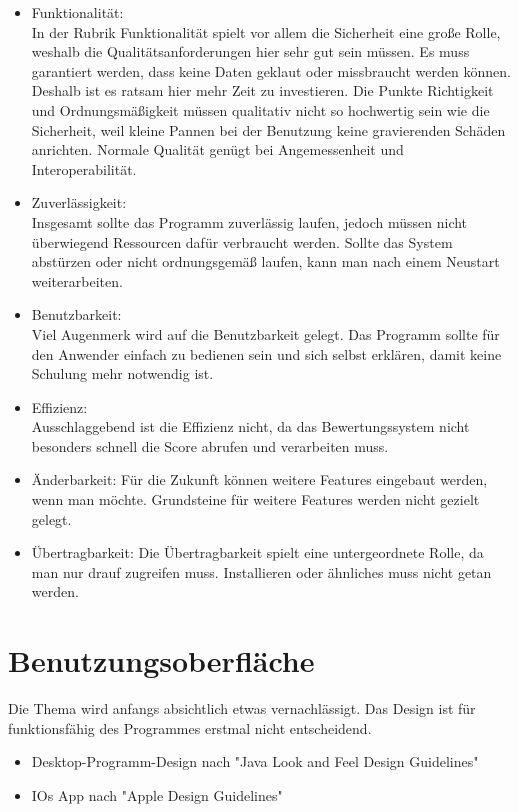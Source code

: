 \documentclass[a4paper,listof=leveldown,listof=numbered]{scrreprt}
\begin{document}
	\begin{itemize}
		\item Funktionalität:\\
		In der Rubrik Funktionalität spielt vor allem die Sicherheit eine große Rolle, weshalb die Qualitätsanforderungen hier sehr gut sein müssen. Es muss garantiert werden, dass keine Daten geklaut oder missbraucht werden können. Deshalb ist es ratsam hier mehr Zeit zu investieren. Die Punkte Richtigkeit und Ordnungsmäßigkeit müssen qualitativ nicht so hochwertig sein wie die Sicherheit, weil kleine Pannen bei der Benutzung keine gravierenden Schäden anrichten. Normale Qualität genügt bei Angemessenheit und Interoperabilität.\\
		
		\item Zuverlässigkeit:\\
		Insgesamt sollte das Programm zuverlässig laufen, jedoch müssen nicht überwiegend Ressourcen dafür verbraucht werden. Sollte das System abstürzen oder nicht ordnungsgemäß laufen, kann man nach einem Neustart weiterarbeiten.\\
		
		\item Benutzbarkeit:\\
		Viel Augenmerk wird auf die Benutzbarkeit gelegt. Das Programm sollte für den Anwender einfach zu bedienen sein und sich selbst erklären, damit keine Schulung mehr notwendig ist. \\
		
		\item 	Effizienz:\\
		Ausschlaggebend ist die Effizienz nicht, da das Bewertungssystem nicht besonders schnell die Score abrufen und verarbeiten muss. \\
		
		\item Änderbarkeit:		
		Für die Zukunft können weitere Features eingebaut werden, wenn man möchte. Grundsteine für weitere Features werden nicht gezielt gelegt.\\
					
		\item  Übertragbarkeit:
		Die Übertragbarkeit spielt eine untergeordnete Rolle, da man nur drauf zugreifen muss. Installieren oder ähnliches muss nicht getan werden. \\
			
	\end{itemize}
	
\chapter{Benutzungsoberfläche}
	Die Thema wird anfangs absichtlich etwas vernachlässigt. Das Design ist für funktionsfähig des Programmes erstmal nicht entscheidend.
	\begin{itemize}
 
		\item Desktop-Programm-Design nach "Java Look and Feel Design Guidelines"
		\item IOs App nach "Apple Design Guidelines"
	\end{itemize}
	
\end{document}
